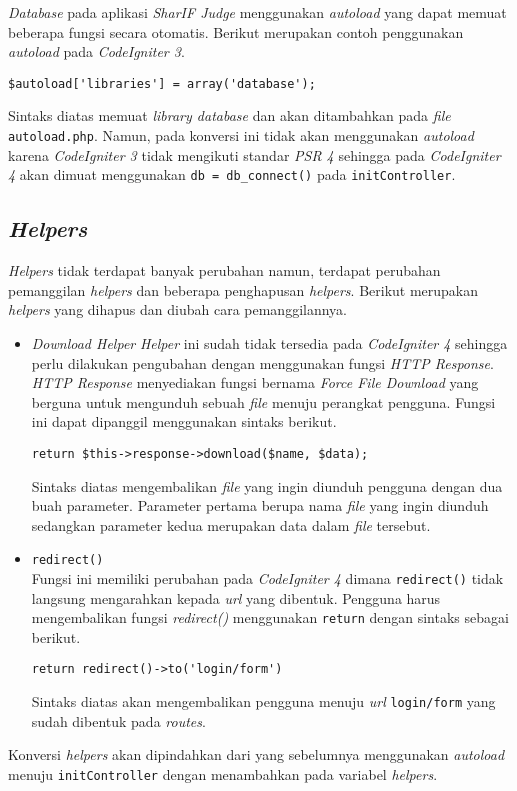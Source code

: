 \textit{Database} pada aplikasi \textit{SharIF Judge} menggunakan \textit{autoload} yang dapat memuat beberapa fungsi secara otomatis. Berikut merupakan contoh penggunakan \textit{autoload} pada \textit{CodeIgniter 3}.
\begin{center}
\verb|$autoload['libraries'] = array('database');|
\end{center}
Sintaks diatas memuat \textit{library database} dan akan  ditambahkan pada \textit{file} \texttt{autoload.php}. Namun, pada konversi ini tidak akan menggunakan \textit{autoload} karena \textit{CodeIgniter 3} tidak mengikuti standar \textit{PSR 4} sehingga pada \textit{CodeIgniter 4} akan dimuat menggunakan \texttt{db = db\_connect()} pada \texttt{initController}.

\subsection{\textit{Helpers}}
\textit{Helpers} tidak terdapat banyak perubahan namun, terdapat perubahan pemanggilan \textit{helpers} dan beberapa penghapusan \textit{helpers}. Berikut merupakan \textit{helpers} yang dihapus dan diubah cara pemanggilannya.
\begin{itemize}
\item \textit{Download Helper}
\textit{Helper} ini sudah tidak tersedia pada \textit{CodeIgniter 4} sehingga perlu dilakukan pengubahan dengan menggunakan fungsi \textit{HTTP Response}. \textit{HTTP Response} menyediakan fungsi bernama \textit{Force File Download} yang berguna untuk mengunduh sebuah \textit{file} menuju perangkat pengguna. Fungsi ini dapat dipanggil menggunakan sintaks berikut.

\begin{center}
 \verb|return $this->response->download($name, $data);|
\end{center}

Sintaks diatas mengembalikan \textit{file} yang ingin diunduh pengguna dengan dua buah parameter. Parameter pertama berupa nama \textit{file} yang ingin diunduh sedangkan parameter kedua merupakan data dalam \textit{file} tersebut.

\item \texttt{redirect()} \\
Fungsi ini memiliki perubahan pada \textit{CodeIgniter 4} dimana \texttt{redirect()} tidak langsung mengarahkan kepada \textit{url} yang dibentuk. Pengguna harus mengembalikan fungsi \textit{redirect()} menggunakan \texttt{return} dengan sintaks sebagai berikut.
\begin{center}
 \verb|return redirect()->to('login/form')|
\end{center} 

Sintaks diatas akan mengembalikan pengguna menuju \textit{url} \texttt{login/form} yang sudah dibentuk pada \textit{routes}.

\end{itemize}

Konversi \textit{helpers} akan dipindahkan dari yang sebelumnya menggunakan \textit{autoload} menuju \texttt{initController} dengan menambahkan pada variabel \textit{helpers}.